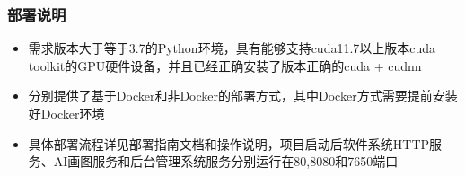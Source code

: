 \begin{frame}
    \frametitle{部署说明}
    \begin{itemize}
        \item 需求版本大于等于3.7的Python环境，具有能够支持cuda11.7以上版本cuda toolkit的GPU硬件设备，并且已经正确安装了版本正确的cuda + cudnn
        \item 分别提供了基于Docker和非Docker的部署方式，其中Docker方式需要提前安装好Docker环境
        \item 具体部署流程详见部署指南文档和操作说明，项目启动后软件系统HTTP服务、AI画图服务和后台管理系统服务分别运行在80,8080和7650端口
    \end{itemize}
\end{frame}